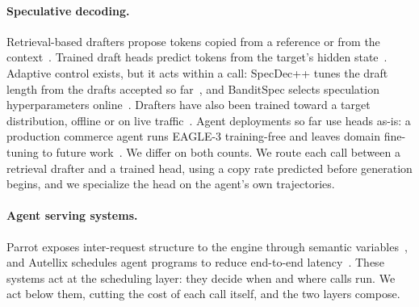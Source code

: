 \paragraph{Speculative decoding.}
Retrieval-based drafters propose tokens copied from a reference or from the context~\citep{llma,suffixdecoding}. Trained draft heads predict tokens from the target's hidden state~\citep{eagle3}. Adaptive control exists, but it acts within a call: SpecDec++ tunes the draft length from the drafts accepted so far~\citep{specdecpp}, and BanditSpec selects speculation hyperparameters online~\citep{banditspec}. Drafters have also been trained toward a target distribution, offline or on live traffic~\citep{distillspec,osd,aurora}. Agent deployments so far use heads as-is: a production commerce agent runs EAGLE-3 training-free and leaves domain fine-tuning to future work~\citep{paypal-eagle}. We differ on both counts. We route each call between a retrieval drafter and a trained head, using a copy rate predicted before generation begins, and we specialize the head on the agent's own trajectories.

\paragraph{Agent serving systems.}
Parrot exposes inter-request structure to the engine through semantic variables~\citep{parrot}, and Autellix schedules agent programs to reduce end-to-end latency~\citep{autellix}. These systems act at the scheduling layer: they decide when and where calls run. We act below them, cutting the cost of each call itself, and the two layers compose.
